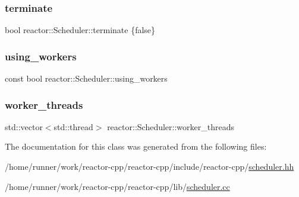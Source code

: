 \subsubsection{\texorpdfstring{terminate}{terminate}}
{\footnotesize\ttfamily bool reactor\+::\+Scheduler\+::terminate \{false\}\hspace{0.3cm}{\ttfamily [private]}}

\mbox{\label{classreactor_1_1Scheduler_ac4b787be81d8b6d7a72ce987d24a2261}} 
\subsubsection{\texorpdfstring{using\+\_\+workers}{using\_workers}}
{\footnotesize\ttfamily const bool reactor\+::\+Scheduler\+::using\+\_\+workers\hspace{0.3cm}{\ttfamily [private]}}

\mbox{\label{classreactor_1_1Scheduler_aad3a17b14df9166b175a3d5baf5afd14}} 
\subsubsection{\texorpdfstring{worker\+\_\+threads}{worker\_threads}}
{\footnotesize\ttfamily std\+::vector$<$std\+::thread$>$ reactor\+::\+Scheduler\+::worker\+\_\+threads\hspace{0.3cm}{\ttfamily [private]}}



The documentation for this class was generated from the following files\+:\begin{DoxyCompactItemize}
\item 
/home/runner/work/reactor-\/cpp/reactor-\/cpp/include/reactor-\/cpp/\hyperlink{scheduler_8hh}{scheduler.\+hh}\item 
/home/runner/work/reactor-\/cpp/reactor-\/cpp/lib/\hyperlink{scheduler_8cc}{scheduler.\+cc}\end{DoxyCompactItemize}
